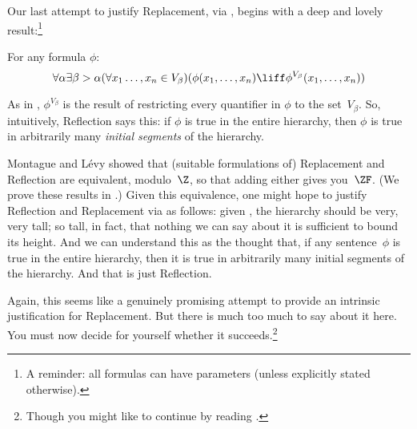 \documentclass[../../../include/open-logic-section]{subfiles}
\begin{document}

Our last attempt to justify Replacement, via \stagesinex, begins with a deep and lovely result:\footnote{A reminder: all formulas can have parameters (unless explicitly stated otherwise).}
\begin{thm}
For any formula $\phi$:
\[
\forall \alpha \exists \beta > \alpha (\forall x_1 \ldots, x_n \in
V_\beta)(\phi(x_1, \ldots, x_n) \liff \phi^{V_\beta}(x_1, \ldots, x_n))
\]
\end{thm}
\noindent 
As in , $\phi^{V_\beta}$ is the result of restricting every
quantifier in $\phi$ to the set~$V_\beta$. So, intuitively, Reflection
says this: if $\phi$ is true in the entire hierarchy, then $\phi$ is
true in arbitrarily many \emph{initial segments} of the hierarchy. 

Montague \cite{Montague1961} and L\'{e}vy \cite{Levy1960} showed that (suitable
formulations of) Replacement and Reflection are equivalent,
modulo~$\Z$, so that adding either gives you~$\ZF$. (We prove these results in .) Given this
equivalence, one might hope to justify Reflection  and Replacement via
\stagesinex{} as follows: given \stagesinex, the hierarchy should be
very, very tall; so tall, in fact, that nothing we can say about it is
sufficient to bound its height. And we can understand this as the
thought that, if any sentence~$\phi$ is true in the entire hierarchy,
then it is true in arbitrarily many initial segments of the hierarchy.
And that is just Reflection. 

Again, this seems like a genuinely promising attempt to provide an
intrinsic justification for Replacement. But there is much too much to
say about it here. You must now decide for yourself whether it
succeeds.\footnote{Though you might like to continue by reading \cite[95--100]{Incurvati2020}.}
\end{document}
